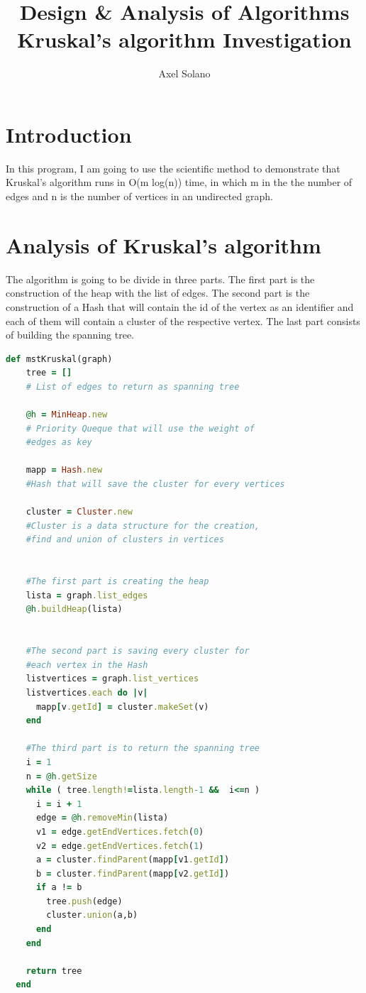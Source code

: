 \documentclass{article}
\title{ \textbf{ Design \& Analysis of Algorithms} \\
Kruskal’s algorithm Investigation }
\author{Axel Solano}
\begin{document}
\maketitle
{}
\tableofcontents
\newpage

\section{Introduction}
In this program, I am going to use the scientific method to demonstrate that Kruskal’s algorithm runs in O(m log(n)) time, in which m in the the number of edges  and n is the number of vertices in an undirected graph.

\section{Analysis of Kruskal’s algorithm}
The algorithm is going to be divide in three parts. The first part is the construction of the heap with the list of edges. The second part is the construction of a Hash that will contain the id of the vertex as an identifier and each of them will contain a cluster of the respective vertex. The last part consists of building the spanning tree.\\


\begin{lstlisting}[language=ruby]
def mstKruskal(graph)
    tree = []
    # List of edges to return as spanning tree

    @h = MinHeap.new
    # Priority Queque that will use the weight of
    #edges as key

    mapp = Hash.new
    #Hash that will save the cluster for every vertices

    cluster = Cluster.new
    #Cluster is a data structure for the creation,
    #find and union of clusters in vertices


    #The first part is creating the heap
    lista = graph.list_edges
    @h.buildHeap(lista)


    #The second part is saving every cluster for
    #each vertex in the Hash
    listvertices = graph.list_vertices
    listvertices.each do |v|
      mapp[v.getId] = cluster.makeSet(v)
    end

    #The third part is to return the spanning tree
    i = 1
    n = @h.getSize
    while ( tree.length!=lista.length-1 &&  i<=n )
      i = i + 1
      edge = @h.removeMin(lista)
      v1 = edge.getEndVertices.fetch(0)
      v2 = edge.getEndVertices.fetch(1)
      a = cluster.findParent(mapp[v1.getId])
      b = cluster.findParent(mapp[v2.getId])
      if a != b
        tree.push(edge)
        cluster.union(a,b)
      end
    end

    return tree
  end
\end{lstlisting}
\end{document}
